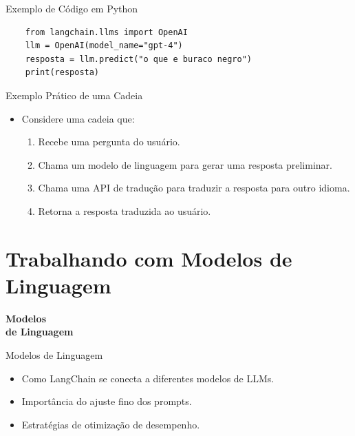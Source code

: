 \documentclass{beamer}
\begin{document}
\begin{frame}[fragile]{Exemplo de Código em Python}
    \begin{verbatim}
    from langchain.llms import OpenAI
    llm = OpenAI(model_name="gpt-4")
    resposta = llm.predict("o que e buraco negro")
    print(resposta)
    \end{verbatim}
\end{frame}



\begin{frame}{Exemplo Prático de uma Cadeia}
\begin{itemize}
    \item Considere uma cadeia que:
    \begin{enumerate}
        \item Recebe uma pergunta do usuário.
        \item Chama um modelo de linguagem para gerar uma resposta preliminar.
        \item Chama uma API de tradução para traduzir a resposta para outro idioma.
        \item Retorna a resposta traduzida ao usuário.
    \end{enumerate}
\end{itemize}

\end{frame}

\section{Trabalhando com Modelos de Linguagem}
\begin{frame}
\centering
\Huge
\textbf{Modelos\\de Linguagem}
\end{frame}
\begin{frame}{Modelos de Linguagem}
    \begin{itemize}
        \item Como LangChain se conecta a diferentes modelos de LLMs.
        \item Importância do ajuste fino dos prompts.
        \item Estratégias de otimização de desempenho.
    \end{itemize}
\end{frame}
\end{document}
